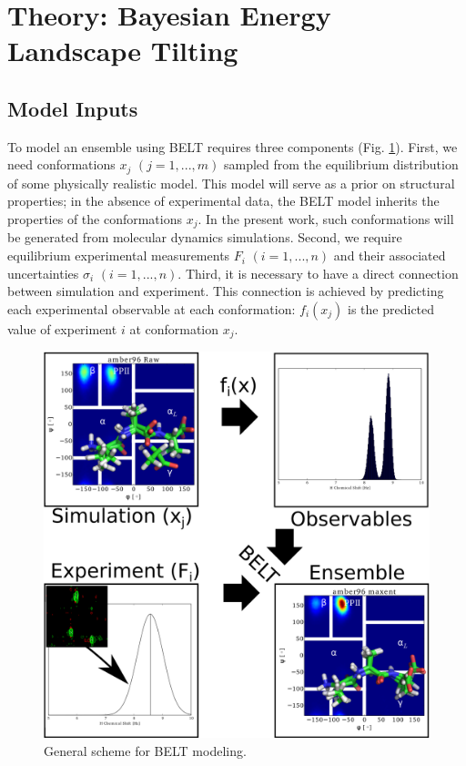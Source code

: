 \documentclass[journal=jacsat,manuscript=article]{achemso}
\begin{document}
\section*{Theory: Bayesian Energy Landscape Tilting}

\subsection*{Model Inputs}

To model an ensemble using BELT requires three components (Fig. \ref{figure:BELT}).  First, we need conformations $x_j$  $(j = 1 , ... , m)$ sampled from the equilibrium distribution of some physically realistic model.  This model will serve as a prior on structural properties; in the absence of experimental data, the BELT model inherits the properties of the conformations $x_j$.  In the present work, such conformations will be generated from molecular dynamics simulations.  Second, we require equilibrium experimental measurements $F_i$ $(i = 1 , ... , n)$ and their associated uncertainties $\sigma_i$ $(i = 1 , ... , n)$.  Third, it is necessary to have a direct connection between simulation and experiment.  This connection is achieved by predicting each experimental observable at each conformation: $f_i(x_j)$ is the predicted value of experiment $i$ at conformation $x_j$.  

\begin{figure}

\includegraphics[width=16.0cm]{figures/info_graphic/info_graphic.png}

\caption{
General scheme for BELT modeling.
}
\label{figure:BELT}
\end{figure}
\end{document}
